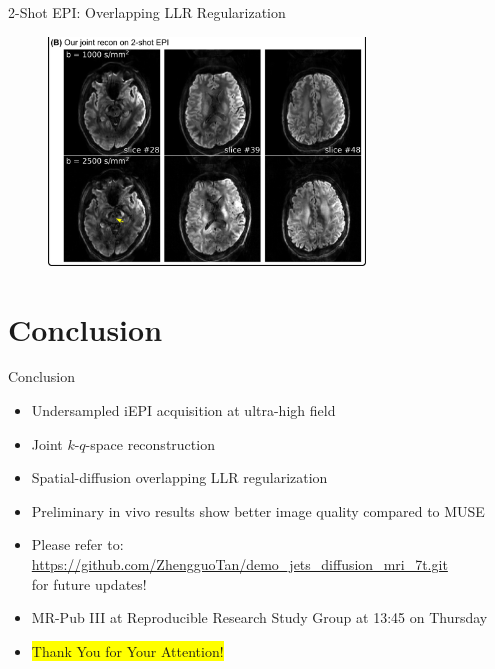 \documentclass[hyperref={colorlinks=true,linkcolor=blue}, aspectratio=169]{beamer}
\begin{document}
	\begin{frame}{2-Shot EPI: Overlapping LLR Regularization}
		\begin{figure}
			\includegraphics[width=0.75\textwidth]{figures/results/fig3_b.png}
		\end{figure}
	\end{frame}


	\section{Conclusion}
	
	\begin{frame}{Conclusion}
		
		\begin{itemize}
			\item <1-> Undersampled iEPI acquisition at ultra-high field
			\vspace{1em}
			\item <2-> Joint $k$-$q$-space reconstruction
			\item <2-> Spatial-diffusion overlapping LLR regularization
			\vspace{1em}
			\item <3-> Preliminary in vivo results show better image quality compared to MUSE
			\vspace{1em}
			\item <4-> Please refer to: \\ \url{https://github.com/ZhengguoTan/demo_jets_diffusion_mri_7t.git} \\
			for future updates!
			\item <5-> MR-Pub III at Reproducible Research Study Group at 13:45 on Thursday
			\vfill
			\item <6-> \colorbox{yellow}{Thank You for Your Attention!}
		\end{itemize}
	\end{frame}
\end{document}
